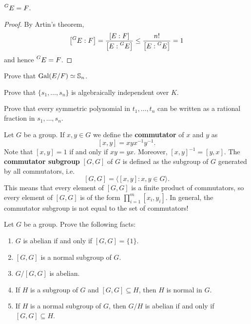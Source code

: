 \begin{theorem}
    $\prescript{G}{}{E}=F$.
\end{theorem}

\begin{proof}
    By Artin's theorem,
    \[
    \left[\prescript{G}{}{E}:F\right]=\frac{[E:F]}{\left[E:\prescript{G}{}{E}\right]}
    \leq\frac{n!}{\left[E:\prescript{G}{}{E}\right]}=1
    \]
    and hence $\prescript{G}{}{E}=F$.
\end{proof}

\begin{exercise}
    Prove that $\operatorname{Gal}(E/F)\simeq\mathbb{S}_n$.
\end{exercise}

\begin{exercise}
    Prove that $\{s_1,\dots,s_n\}$ is algebraically independent over $K$. 
\end{exercise}

\begin{exercise}
    Prove that every symmetric polynomial in $t_1,\dots,t_n$ can be written as a rational
    fraction in $s_1,\dots,s_n$. 
\end{exercise}


Let $G$ be a group. If $x,y\in G$ we define
the \textbf{commutator} of $x$ and $y$ as
\[
[x,y]=xyx^{-1}y^{-1}.
\]
Note that $[x,y]=1$ if and only if $xy=yx$. 
Moreover, $[x,y]^{-1}=[y,x]$. 
The
\textbf{commutator subgroup} $[G,G]$ of $G$ is defined as
the subgroup of $G$ generated by all commutators, i.e. 
\[
[G,G]=\langle [x,y]:x,y\in G\rangle.
\]
This means that every element of $[G,G]$ is a finite product of commutators, 
so every element of $[G,G]$ is of the form $\prod_{i=1}^m [x_i,y_i]$. 
In general, the commutator subgroup is not equal to the set of commutators!

\begin{exercise}
    Let $G$ be a group. 
    Prove the following facts:
    \begin{enumerate}
        \item $G$ is abelian if and only if $[G,G]=\{1\}$.
        \item $[G,G]$ is a normal subgroup of $G$. 
        \item $G/[G,G]$ is abelian. 
        \item If $H$ is a subgroup of $G$ and $[G,G]\subseteq H$, then 
        $H$ is normal in $G$.
        \item If $H$ is a normal subgroup of $G$, then 
        $G/H$ is abelian if and only if $[G,G]\subseteq H$. 
    \end{enumerate}
\end{exercise}

